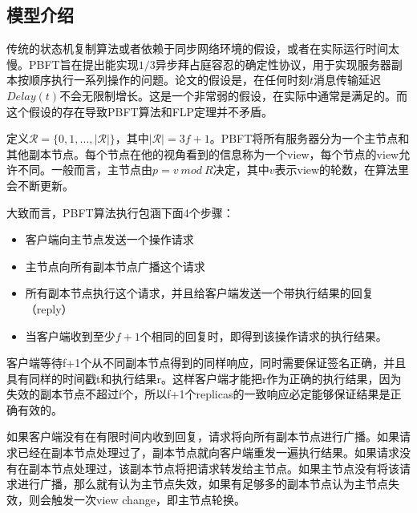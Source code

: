 \subsection{模型介绍}
传统的状态机复制算法或者依赖于同步网络环境的假设，或者在实际运行时间太慢。PBFT旨在提出能实现$1/3$异步拜占庭容忍的确定性协议，用于实现服务器副本按顺序执行一系列操作的问题。论文的假设是，在任何时刻$t$消息传输延迟$Delay(t)$不会无限制增长。这是一个非常弱的假设，在实际中通常是满足的。而这个假设的存在导致PBFT算法和FLP定理并不矛盾。

定义$\mathcal{R}=\{0,1,...,|\mathcal{R}|\}$，其中$|\mathcal{R}|=3f+1$。PBFT将所有服务器分为一个主节点和其他副本节点。每个节点在他的视角看到的信息称为一个view，每个节点的view允许不同。一般而言，主节点由$p=v~mod~R$决定，其中$v$表示view的轮数，在算法里会不断更新。

大致而言，PBFT算法执行包涵下面4个步骤：
\begin{itemize}
	\item 客户端向主节点发送一个操作请求
    \item 主节点向所有副本节点广播这个请求
    \item 所有副本节点执行这个请求，并且给客户端发送一个带执行结果的回复（reply）
    \item 当客户端收到至少$f+1$个相同的回复时，即得到该操作请求的执行结果。
\end{itemize}

客户端等待f+1个从不同副本节点得到的同样响应，同时需要保证签名正确，并且具有同样的时间戳t和执行结果r。这样客户端才能把r作为正确的执行结果，因为失效的副本节点不超过f个，所以f+1个replicas的一致响应必定能够保证结果是正确有效的。

如果客户端没有在有限时间内收到回复，请求将向所有副本节点进行广播。如果请求已经在副本节点处理过了，副本节点就向客户端重发一遍执行结果。如果请求没有在副本节点处理过，该副本节点将把请求转发给主节点。如果主节点没有将该请求进行广播，那么就有认为主节点失效，如果有足够多的副本节点认为主节点失效，则会触发一次view change，即主节点轮换。

